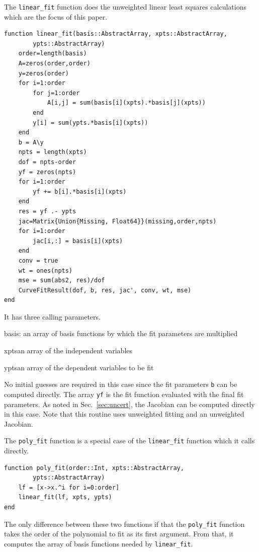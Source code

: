 \documentclass{scrartcl}
\begin{document}
The \texttt{linear\_fit} function does the unweighted
linear least squares calculations which are the focus of
this paper.
\begin{lstlisting}
function linear_fit(basis::AbstractArray, xpts::AbstractArray,
        ypts::AbstractArray)
    order=length(basis)
    A=zeros(order,order)
    y=zeros(order)
    for i=1:order
        for j=1:order
            A[i,j] = sum(basis[i](xpts).*basis[j](xpts))
        end
        y[i] = sum(ypts.*basis[i](xpts))
    end
    b = A\y
    npts = length(xpts)
    dof = npts-order
    yf = zeros(npts)
    for i=1:order
        yf += b[i].*basis[i](xpts)
    end
    res = yf .- ypts
    jac=Matrix{Union{Missing, Float64}}(missing,order,npts)
    for i=1:order
        jac[i,:] = basis[i](xpts)
    end
    conv = true
    wt = ones(npts)
    mse = sum(abs2, res)/dof
    CurveFitResult(dof, b, res, jac', conv, wt, mse)
end
\end{lstlisting}
It has three calling parameters.
\begin{description}
\item{basis:} an array of basis functions by which the
fit parameters are multiplied
\item{xpts}an array of the independent variables
\item{ypts}an array of the dependent variables to be fit
\end{description}
No initial guesses are required in this case since the fit
parameters \texttt{b} can be computed directly. The array
\texttt{yf} is the fit function evaluated with the final fit
parameters. As noted in Sec.~\ref{sec:uncert}, the Jacobian
can be computed directly in this case. Note that this routine
uses unweighted fitting and an unweighted Jacobian.

The \texttt{poly\_fit} function is a special case of the
\texttt{linear\_fit} function which it calls directly.
\begin{lstlisting}
function poly_fit(order::Int, xpts::AbstractArray,
		ypts::AbstractArray)
    lf = [x->x.^i for i=0:order]
    linear_fit(lf, xpts, ypts)
end
\end{lstlisting}
The only difference between these two functions if that the
\texttt{poly\_fit} function takes the order of the
polynomial to fit as its first argument. From that, it
computes the array of basis functions needed by
\texttt{linear\_fit}.
\end{document}
